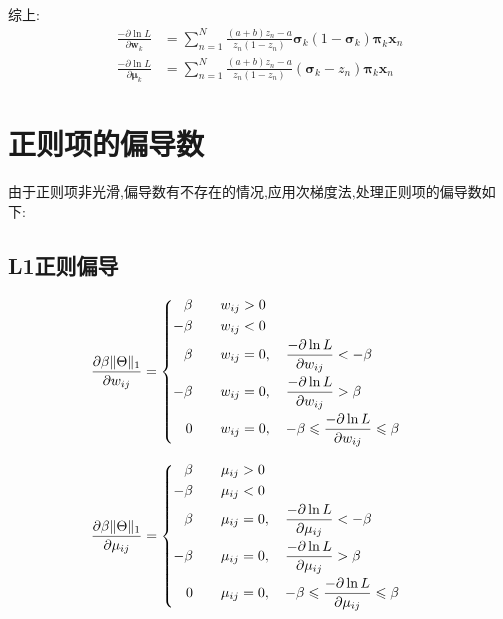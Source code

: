 \documentclass[UTF8,10pt, twoside]{article}
\begin{document}
综上:
\begin{equation} 
\begin{aligned}   
	\frac{-\partial\ln L}{\partial \bm{w}_k}&=\sum_{n=1}^N\frac{(a+b)z_n-a}{z_n(1-z_n)}
	\bm{\sigma}_k(1-\bm{\sigma}_k)\bm{\pi}_k \bm{x}_n \\
	\frac{-\partial\ln L}{\partial \bm{\mu}_k} &=\sum_{n=1}^N\frac{(a+b)z_n-a}{z_n(1-z_n)} 
	(\bm{\sigma}_k -z_n)\bm{\pi}_k \bm{x}_n
\end{aligned}
\end{equation} 
\newline
\section{正则项的偏导数}
由于正则项非光滑,偏导数有不存在的情况,应用次梯度法,处理正则项的偏导数如下:
\subsection{L1正则偏导}
\begin{equation} 
\frac{\partial \beta\|\Theta\|_{1}}{\partial w_{ij}} = 
\begin{cases}
	\begin{aligned} 
		\beta \qquad  w_{ij} &> 0  \cr 
		-\beta \qquad  w_{ij} &< 0  \cr 
		\beta \qquad  w_{ij} &= 0, \quad \frac{-\partial \ln L}{\partial w_{ij}}<-\beta\cr 
		-\beta \qquad  w_{ij} &= 0, \quad \frac{-\partial \ln L}{\partial w_{ij}}>\beta \cr
		0 \qquad       w_{ij} &= 0, \quad -\beta\leqslant\frac{-\partial \ln L}{\partial w_{ij}}\leqslant\beta
	\end{aligned}
\end{cases}
\end{equation}

\begin{equation} 
\frac{\partial \beta\|\Theta\|_{1}}{\partial \mu_{ij}} = 
\begin{cases}
\begin{aligned} 
			\beta \qquad  \mu_{ij} &> 0  \cr 
			-\beta \qquad  \mu_{ij} &< 0  \cr 
			\beta \qquad  \mu_{ij} &= 0, \quad \frac{-\partial \ln L}{\partial \mu_{ij}}<-\beta\cr 
			-\beta \qquad  \mu_{ij} &= 0, \quad \frac{-\partial \ln L}{\partial \mu_{ij}}>\beta\cr
			0 \qquad       \mu_{ij} &= 0, \quad -\beta\leqslant\frac{-\partial \ln L}{\partial \mu_{ij}}\leqslant\beta
	 
	\end{aligned}
\end{cases}
\end{equation}
	
\end{document}
